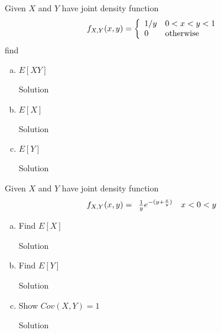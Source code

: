 \documentclass{article}
\begin{document}
\begin{spacing}{1.1}
\newpage
\begin{homeworkProblem}
  Given $X$ and $Y$ have joint density function
  \[
    f_{X, Y}( x, y) = \left\{ \begin{array}{l l}
      1/y &0 < x < y < 1\\
      0   &\text{otherwise}
    \end{array}\right.
  \]
  find
  \begin{enumerate}[(a)]
    \item $E[XY]$
      \begin{homeworkSection}{Solution}
      \end{homeworkSection}
    \item $E[X]$
      \begin{homeworkSection}{Solution}
      \end{homeworkSection}
    \item $E[Y]$
      \begin{homeworkSection}{Solution}
      \end{homeworkSection}
  \end{enumerate}
\end{homeworkProblem}

\newpage
\begin{homeworkProblem}
  Given $X$ and $Y$ have joint density function
  \[
    f_{X, Y}( x, y) = \begin{array}{l l}
      \frac{ 1}{ y} e^{-(y + \frac{ x}{ y})} & x < 0 < y\\
    \end{array}
  \]
  \begin{enumerate}[(a)]
    \item Find $E[X]$
      \begin{homeworkSection}{Solution}
      \end{homeworkSection}
    \item Find $E[Y]$
      \begin{homeworkSection}{Solution}
      \end{homeworkSection}
    \item Show $Cov( X, Y) = 1$
      \begin{homeworkSection}{Solution}
      \end{homeworkSection}
  \end{enumerate}
\end{homeworkProblem}


\end{spacing}
\end{document}
